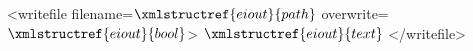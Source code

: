 <writefile filename=$\xmlstructref{eiout}{path}$ overwrite=$\xmlstructref{eiout}{bool}$>
  $\xmlstructref{eiout}{text}$
</writefile>
